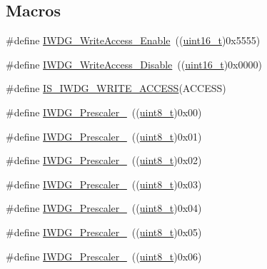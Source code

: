 \subsection*{Macros}
\begin{DoxyCompactItemize}
\item 
\#define \hyperlink{group___i_w_d_g___write_access_ga86f4b926f4351e19ea069f98c2e65f91}{I\+W\+D\+G\+\_\+\+Write\+Access\+\_\+\+Enable}~((\hyperlink{_p_e___types_8h_a1f1825b69244eb3ad2c7165ddc99c956}{uint16\+\_\+t})0x5555)
\item 
\#define \hyperlink{group___i_w_d_g___write_access_ga4b395cf5b2d7ab18fc71a5f779f758cc}{I\+W\+D\+G\+\_\+\+Write\+Access\+\_\+\+Disable}~((\hyperlink{_p_e___types_8h_a1f1825b69244eb3ad2c7165ddc99c956}{uint16\+\_\+t})0x0000)
\item 
\#define \hyperlink{group___i_w_d_g___write_access_gaa89c93332f5977175f8d416b7492de18}{I\+S\+\_\+\+I\+W\+D\+G\+\_\+\+W\+R\+I\+T\+E\+\_\+\+A\+C\+C\+E\+SS}(A\+C\+C\+E\+SS)
\item 
\#define \hyperlink{group___i_w_d_g__prescaler_ga82a058c196d5a9cd7ea2f2202b394ba0}{I\+W\+D\+G\+\_\+\+Prescaler\+\_}~((\hyperlink{_p_e___types_8h_aba7bc1797add20fe3efdf37ced1182c5}{uint8\+\_\+t})0x00)
\item 
\#define \hyperlink{group___i_w_d_g__prescaler_ga59763b9a127c67adf5d11474188996a1}{I\+W\+D\+G\+\_\+\+Prescaler\+\_}~((\hyperlink{_p_e___types_8h_aba7bc1797add20fe3efdf37ced1182c5}{uint8\+\_\+t})0x01)
\item 
\#define \hyperlink{group___i_w_d_g__prescaler_gafa81d30511ff5ec74bb38ed71f5bb66e}{I\+W\+D\+G\+\_\+\+Prescaler\+\_}~((\hyperlink{_p_e___types_8h_aba7bc1797add20fe3efdf37ced1182c5}{uint8\+\_\+t})0x02)
\item 
\#define \hyperlink{group___i_w_d_g__prescaler_gaa8b091b6e4102513b1e3a1c4eb6756ba}{I\+W\+D\+G\+\_\+\+Prescaler\+\_}~((\hyperlink{_p_e___types_8h_aba7bc1797add20fe3efdf37ced1182c5}{uint8\+\_\+t})0x03)
\item 
\#define \hyperlink{group___i_w_d_g__prescaler_ga7ea813c73ae0acb40acb60e7d3956910}{I\+W\+D\+G\+\_\+\+Prescaler\+\_}~((\hyperlink{_p_e___types_8h_aba7bc1797add20fe3efdf37ced1182c5}{uint8\+\_\+t})0x04)
\item 
\#define \hyperlink{group___i_w_d_g__prescaler_gaea6bf96c2fd5a6f3b9574e7898096641}{I\+W\+D\+G\+\_\+\+Prescaler\+\_}~((\hyperlink{_p_e___types_8h_aba7bc1797add20fe3efdf37ced1182c5}{uint8\+\_\+t})0x05)
\item 
\#define \hyperlink{group___i_w_d_g__prescaler_ga7d6e918748185639049644c970db2b43}{I\+W\+D\+G\+\_\+\+Prescaler\+\_}~((\hyperlink{_p_e___types_8h_aba7bc1797add20fe3efdf37ced1182c5}{uint8\+\_\+t})0x06)

\end{DoxyCompactItemize}
